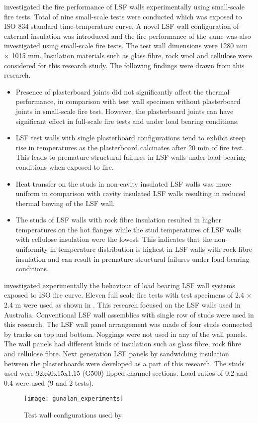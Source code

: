 \citet{Kolarkar2012} investigated the fire performance of LSF walls experimentally using small-scale fire tests. Total of nine small-scale tests were conducted which was exposed to ISO 834 standard time-temperature curve. A novel LSF wall configuration of external insulation was introduced and the fire performance of the same was also investigated using small-scale fire tests. The test wall dimensions were 1280 mm $\times$ 1015 mm. Insulation materials such as glass fibre, rock wool and cellulose were considered for this research study. The following findings were drawn from this research.
\begin{itemize}
	\item Presence of plasterboard joints did not significantly affect the thermal performance, in comparison with test wall specimen without plasterboard joints in small-scale fire test. However, the plasterboard joints can have significant effect in full-scale fire tests and under load bearing conditions.
	\item LSF test walls with single plasterboard configurations tend to exhibit steep rise in temperatures as the plasterboard calcinates after 20 min of fire test. This leads to premature structural failures in LSF walls under load-bearing conditions when exposed to fire.
	\item Heat transfer on the studs in non-cavity insulated LSF walls was more uniform in comparison with cavity insulated LSF walls resulting in reduced thermal bowing of the LSF wall.
	\item The studs of LSF walls with rock fibre insulation resulted in higher temperatures on the hot flanges while the stud temperatures of LSF walls with cellulose insulation were the lowest. This indicates that the non-uniformity in temperature distribution is highest in LSF walls with rock fibre insulation and can result in premature structural failures under load-bearing conditions.
\end{itemize}

\citet{Gunalan2013e} investigated experimentally the behaviour of load bearing LSF wall systems exposed to ISO fire curve. Eleven full scale fire tests with test specimens of 2.4 $\times$ 2.4 m were used as shown in . This research focused on the LSF walls used in Australia. Conventional LSF wall assemblies with single row of studs were used in this research. The LSF wall panel arrangement was made of four studs connected by tracks on top and bottom. Noggings were not used in any of the wall panels. The wall panels had different kinds of insulation such as glass fibre, rock fibre and cellulose fibre. Next generation LSF panels by sandwiching insulation between the plasterboards were developed as a part of this research. The studs used were 92x40x15x1.15 (G500) lipped channel sections. Load ratios of 0.2 and 0.4 were used (9 and 2 tests). 
\begin{figure}[!htbp]
	\centering
		\texttt{[image: gunalan\_experiments]}		
		\caption{Test wall configurations used by \citet{Gunalan2013e}}
			\label{fig:gunalan_experiments}
	\end{figure}

